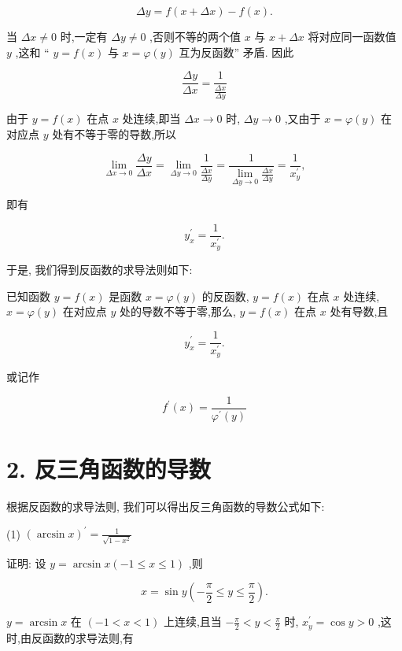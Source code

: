 \documentclass[10pt]{article}
\begin{document}
\[
{\Delta y} = f\left( {x + {\Delta x}}\right) - f\left( x\right) .
\]

当 \({\Delta x} \neq 0\) 时,一定有 \({\Delta y} \neq 0\) ,否则不等的两个值 \(x\) 与 \(x + {\Delta x}\) 将对应同一函数值 \(y\) ,这和 “ \(y = f\left( x\right)\) 与 \(x = \varphi \left( y\right)\) 互为反函数” 矛盾. 因此

\[
\frac{\Delta y}{\Delta x} = \frac{1}{\frac{\Delta x}{\Delta y}}
\]

由于 \(y = f\left( x\right)\) 在点 \(x\) 处连续,即当 \({\Delta x} \rightarrow 0\) 时, \({\Delta y} \rightarrow 0\) ,又由于 \(x = \varphi \left( y\right)\) 在对应点 \(y\) 处有不等于零的导数,所以

\[
\mathop{\lim }\limits_{{{\Delta x} \rightarrow 0}}\frac{\Delta y}{\Delta x} = \mathop{\lim }\limits_{{{\Delta y} \rightarrow 0}}\frac{1}{\frac{\Delta x}{\Delta y}} = \frac{1}{\mathop{\lim }\limits_{{{\Delta y} \rightarrow 0}}\frac{\Delta x}{\Delta y}} = \frac{1}{{x}_{y}^{\prime }},
\]

即有

\[
{y}_{x}^{\prime } = \frac{1}{{x}_{y}^{\prime }}.
\]

于是, 我们得到反函数的求导法则如下:

已知函数 \(y = f\left( x\right)\) 是函数 \(x = \varphi \left( y\right)\) 的反函数, \(y = f\left( x\right)\) 在点 \(x\) 处连续, \(x = \varphi \left( y\right)\) 在对应点 \(y\) 处的导数不等于零,那么, \(y = f\left( x\right)\) 在点 \(x\) 处有导数,且

\[
{y}_{x}^{\prime } = \frac{1}{{x}_{y}^{\prime }}\text{.}
\]

或记作

\[
{f}^{\prime }\left( x\right) = \frac{1}{{\varphi }^{\prime }\left( y\right) }
\]

\section*{2. 反三角函数的导数}

根据反函数的求导法则, 我们可以得出反三角函数的导数公式如下:

(1) \({\left( \arcsin x\right) }^{\prime } = \frac{1}{\sqrt{1 - {x}^{2}}}\)

证明: 设 \(y = \arcsin x\left( {-1 \leq x \leq 1}\right)\) ,则

\[
x = \sin y\left( {-\frac{\pi }{2} \leq y \leq \frac{\pi }{2}}\right) .
\]

\(y = \arcsin x\) 在 \(\left( {-1 < x < 1}\right)\) 上连续,且当 \(- \frac{\pi }{2} < y < \frac{\pi }{2}\) 时, \({x}_{y}^{\prime } = \cos y > 0\) ,这时,由反函数的求导法则,有
\end{document}
